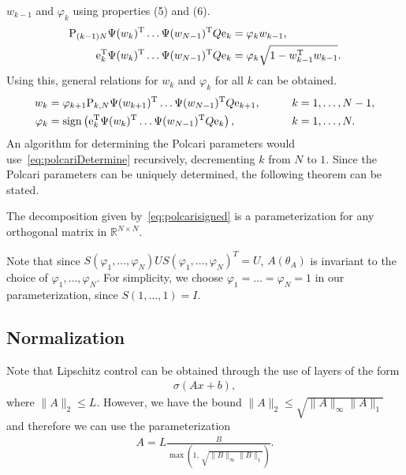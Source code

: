\documentclass[12pt]{article}
\begin{document}
$w_{k-1}$ and $\varphi_k$ using properties (5) and (6).
\begin{align*}
  {\rm P}_{(k-1)N} \Psi(w_{k})^{\rm T} \dots \Psi(w_{N-1})^{\rm T} Q {\rm e}_k
  &= \varphi_k w_{k-1}, \\
  {\rm e}_k^{\rm T} \Psi(w_{k})^{\rm T} \dots \Psi(w_{N-1})^{\rm T} Q {\rm e}_k
  &= \varphi_k \sqrt{1 - w_{k-1}^{\rm T} w_{k-1}}.
\end{align*}
%
Using this, general relations for $w_k$ and $\varphi_k$ for all $k$ can be obtained.
\bse
\begin{alignat}{2}
  w_{k} &= \varphi_{k+1} {\rm P}_{k,N} \Psi(w_{k+1})^{\rm T} \dots \Psi(w_{N-1})^{\rm T} Q {\rm e}_{k+1},
            \qquad &&k=1, \dots, N-1,\\
  \varphi_k &= {\rm sign}\left({\rm e}_k^{\rm T} \Psi(w_{k})^{\rm T} \dots \Psi(w_{N-1})^{\rm T} Q {\rm e}_k\right) ,
              \qquad &&k=1, \dots, N.
\end{alignat}\label{eq:polcariDetermine}
\ese
%
An algorithm for determining the Polcari parameters would use~\eqref{eq:polcariDetermine}
recursively, decrementing $k$ from $N$ to $1$.
Since the Polcari parameters can be uniquely determined, the following theorem can be stated.

{\theorem The decomposition given by~\eqref{eq:polcarisigned}
  is a parameterization for any orthogonal matrix in $\mathbb{R}^{N \times N}$.
}

\medskip

Note that since $S(\varphi_1, \dots, \varphi_N) U S(\varphi_1, \dots, \varphi_N)^T = U$,
$A(\theta_A)$ is invariant to the choice of $\varphi_1, \dots, \varphi_N$.
For simplicity, we choose $\varphi_1 = \dots = \varphi_N = 1$ in our parameterization,
since $S(1, \dots, 1) = I$.

\subsection{Normalization}

Note that Lipschitz control can be obtained through the use of layers of the form
\begin{align}
  \sigma(A x + b),
\end{align}
%
where $\|A\|_2 \le L$.
However, we have the bound
$\|A\|_2 \le \sqrt{\|A\|_{\infty} \|A\|_1}$ and therefore we can use the parameterization
\begin{align}
  A = L \frac{B}{\max(1,\, \sqrt{\|B\|_{\infty} \|B\|_1})}.
\end{align}



\end{document}
